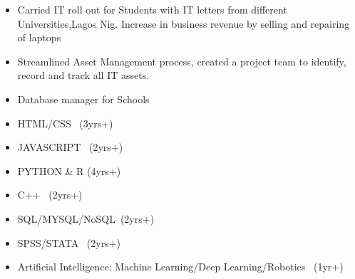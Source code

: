 \documentclass{article}
\begin{document}
\begin{itemize}
\item Carried IT roll out for Students with IT letters from different Universities,Lagos Nig. Increase in business revenue by selling and repairing of laptops
\divider
\item Streamlined Asset Management process, created a project team to identify, record and track all IT assets. 
\divider

\item Database manager for Schools
\end{itemize}
\divider

\begin{itemize}
\item HTML/CSS \ (3yrs+)					
\item JAVASCRIPT \ (2yrs+)
\item PYTHON \& R  (4yrs+)
\item C++ \ (2yrs+)
\item SQL/MYSQL/NoSQL\ (2yrs+)
\item SPSS/STATA \ (2yrs+)
\item Artificial Intelligence: Machine Learning/Deep Learning/Robotics \ (1yr+)
\end{itemize}

%


\end{document}
